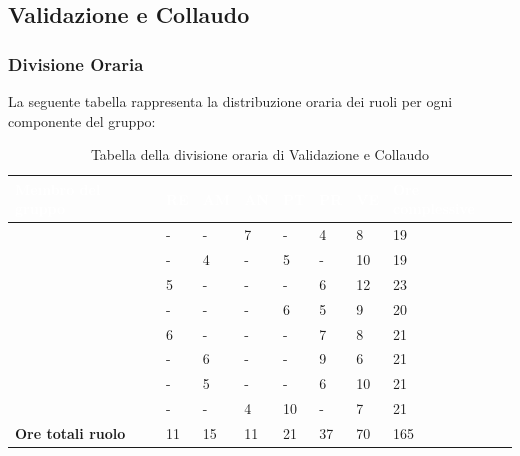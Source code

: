 \subsection{Validazione e Collaudo}

\subsubsection{Divisione Oraria}
La seguente tabella rappresenta la distribuzione oraria dei ruoli per ogni componente del gruppo:
{
\renewcommand{\arraystretch}{2}
\begin{longtable}[h!] { C{4cm} C{1cm} C{1cm} C{1cm} C{1cm} C{1cm} C{1cm} C{3cm}}
\caption{Tabella della divisione oraria di Validazione e Collaudo}\\

\textcolor{white}{\textbf{Membro del gruppo}} & 
\textcolor{white}{\textbf{RE}} & 
\textcolor{white}{\textbf{AM}} & 
\textcolor{white}{\textbf{AN}} & 
\textcolor{white}{\textbf{PT}} & 
\textcolor{white}{\textbf{PR}} &
\textcolor{white}{\textbf{VE}} &
\textcolor{white}{\textbf{Ore complessive}}\\	
\endhead
        
\MC{}                     &  - &  - &  7 &  - &  4 &  8 &  19 \\
\LD{}                     &  - &  4 &  - &  5 &  - & 10 &  19 \\
\CE{}                     &  5 &  - &  - &  - &  6 & 12 &  23 \\ 
\SE{}                     &  - &  - &  - &  6 &  5 &  9 &  20 \\
\PF{}                     &  6 &  - &  - &  - &  7 &  8 &  21 \\
\DF{}                     &  - &  6 &  - &  - &  9 &  6 &  21 \\
\BR{}                     &  - &  5 &  - &  - &  6 & 10 &  21 \\
\AT{}                     &  - &  - &  4 & 10 &  - &  7 &  21 \\
\textbf{Ore totali ruolo} & 11 & 15 & 11 & 21 & 37 & 70 & 165 \\
		
\end{longtable}
}


